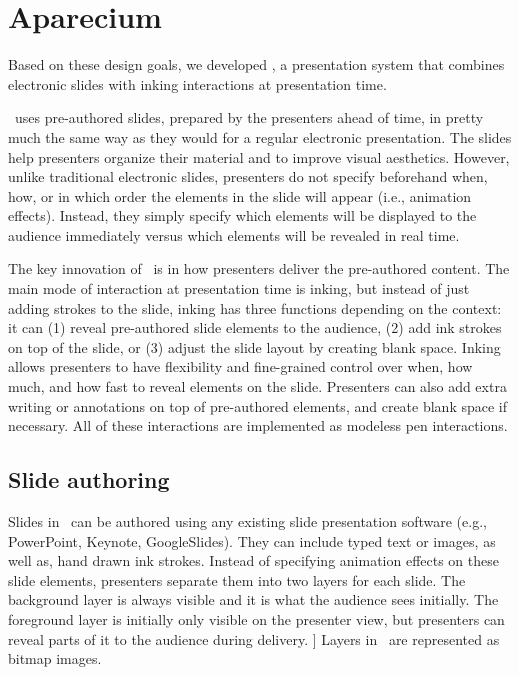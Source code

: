 \section{Aparecium}

Based on these design goals, we developed \interface, a presentation system that combines electronic slides with inking interactions at presentation time. 

\interface\ uses pre-authored slides, prepared by the presenters ahead of time, in pretty much the same way as they would for a regular electronic presentation. The slides help presenters organize their material and to improve visual aesthetics. However, unlike traditional electronic slides, presenters do not specify beforehand when, how, or in which order the elements in the slide will appear (i.e., animation effects). Instead, they simply specify which elements will be displayed to the audience immediately versus which elements will be revealed in real time. 

The key innovation of \interface\ is in how presenters deliver the pre-authored content.
The main mode of interaction at presentation time is inking, but instead of just adding strokes to the slide, inking has three functions depending on the context: it can (1) reveal pre-authored slide elements to the audience, (2) add ink strokes on top of the slide, or (3) adjust the slide layout by creating blank space. Inking allows presenters to have flexibility and fine-grained control over when, how much, and how fast to reveal elements on the slide. Presenters can also add extra writing or annotations on top of pre-authored elements, and create blank space if necessary. All of these interactions are implemented as modeless pen interactions. 

 
\subsection{Slide authoring}
Slides in \interface\ can be authored using any existing slide presentation software (e.g., PowerPoint, Keynote, GoogleSlides). They can include typed text or images, as well as, hand drawn ink strokes. Instead of specifying animation effects on these slide elements, presenters separate them into two layers for each slide. The background layer is always visible and it is what the audience sees initially. The foreground layer is initially only visible on the presenter view, but presenters can reveal parts of it to the audience during delivery. ] Layers in \interface\ are represented as bitmap images. 

